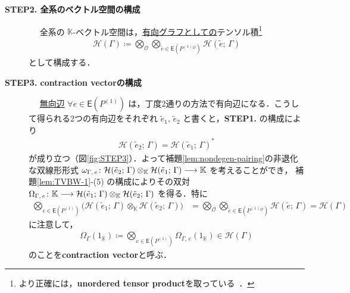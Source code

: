 \documentclass[TQFT_main]{subfiles}
\begin{document}
\begin{description}
    \item[\textbf{STEP2. 全系のベクトル空間の構成}]　
    \label{TV:STEP2}
    全系の $\mathbb{K}$-ベクトル空間は，\underline{有向グラフとしての}テンソル積\footnote{より正確には，\textbf{unordered tensor product}を取っている~\cite[Appendix E, p.477]{Turaev2017}．}
    \begin{align}
        \mathcal{H}(\Gamma) \coloneqq \bigotimes_{\mathcal{O}} \bigotimes_{\tilde{e} \in \mathsf{E}(P^{(1)}{}^{\mathcal{O}})} \mathcal{H} (\tilde{e};\, \Gamma)
    \end{align}
    として構成する．

    \item[\textbf{STEP3. contraction vectorの構成}]　
    \label{TV:STEP3}
    \underline{無向辺} $\forall e \in \mathsf{E}(P^{(1)})$ は，丁度2通りの方法で有向辺になる．こうして得られる2つの有向辺をそれぞれ $\tilde{e}_1,\, \tilde{e}_2$ と書くと，\textsf{\textbf{STEP1.}} の構成により
    \begin{align}
        \mathcal{H} (\tilde{e}_2;\, \Gamma) = \mathcal{H} (\tilde{e}_1;\, \Gamma)^*
    \end{align}
    が成り立つ（図\ref{fig:STEP3}）．よって補題\ref{lem:nondegen-pairing}の非退化な双線形形式 $\omega_{\Gamma,\, e} \colon \mathcal{H} (\tilde{e}_2;\, \Gamma) \otimes_{\mathbb{K}} \mathcal{H} (\tilde{e}_1;\, \Gamma) \longrightarrow \mathbb{K}$ を考えることができ，
    補題\ref{lem:TVBW-1}-(5) の構成によりその双対 $\Omega_{\Gamma,\, e} \colon \mathbb{K} \longrightarrow \mathcal{H} (\tilde{e}_1;\, \Gamma) \otimes_{\mathbb{K}} \mathcal{H} (\tilde{e}_2;\, \Gamma)$ を得る．特に
    \begin{align}
        \bigotimes_{e \in \mathsf{E}(P^{(1)})} \bigl( \mathcal{H} (\tilde{e}_1;\, \Gamma) \otimes_{\mathbb{K}} \mathcal{H} (\tilde{e}_2;\, \Gamma)\bigr)
        &= \bigotimes_{\mathcal{O}} \bigotimes_{\tilde{e} \in \mathsf{E}(P^{(1)}{}^{\mathcal{O}})} \mathcal{H} (\tilde{e};\, \Gamma) = \mathcal{H}(\Gamma)
    \end{align}
    に注意して，
    \begin{align}
        \label{eq:contraction}
        \Omega_\Gamma(1_{\mathbb{K}}) \coloneqq \bigotimes_{e \in \mathsf{E}(P^{(1)})} \Omega_{\Gamma,\, e} (1_{\mathbb{K}}) \in \mathcal{H}(\Gamma)
    \end{align}
    のことを\textbf{contraction vector}と呼ぶ．

    \begin{figure}[H]
        \centering
\end{figure}
\end{description}
\end{document}
